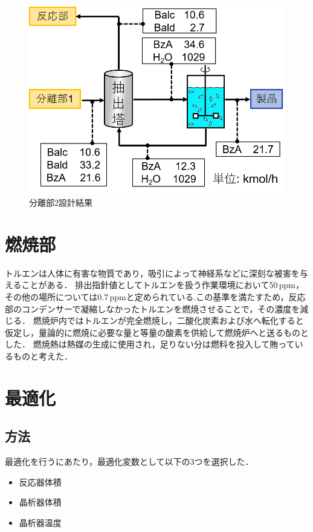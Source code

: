 \documentclass[a4j]{jsreport}
\begin{document}
\begin{figure}[htbp]
  \centering
  \includegraphics[scale=0.7]{Separion2Conclusion.png}
  \caption{分離部2設計結果}
  \label{分離部2設計結果}
\end{figure}


\clearpage
\chapter{燃焼部}
トルエンは人体に有害な物質であり，吸引によって神経系などに深刻な被害を与えることがある．
排出指針値としてトルエンを扱う作業環境において50\,ppm，その他の場所については0.7\,ppmと定められている\cite{トルエン排出基準}.この基準を満たすため，反応部のコンデンサーで凝縮しなかったトルエンを燃焼させることで，その濃度を減じる．
燃焼炉内ではトルエンが完全燃焼し，二酸化炭素および水へ転化すると仮定し，量論的に燃焼に必要な量と等量の酸素を供給して燃焼炉へと送るものとした．
燃焼熱は熱媒の生成に使用され，足りない分は燃料を投入して賄っているものと考えた．

\clearpage
\chapter{最適化}
\section{方法}
最適化を行うにあたり，最適化変数として以下の3つを選択した．
\begin{itemize}
  \item 反応器体積
  \item 晶析器体積
  \item 晶析器温度
\end{itemize}
\end{document}
